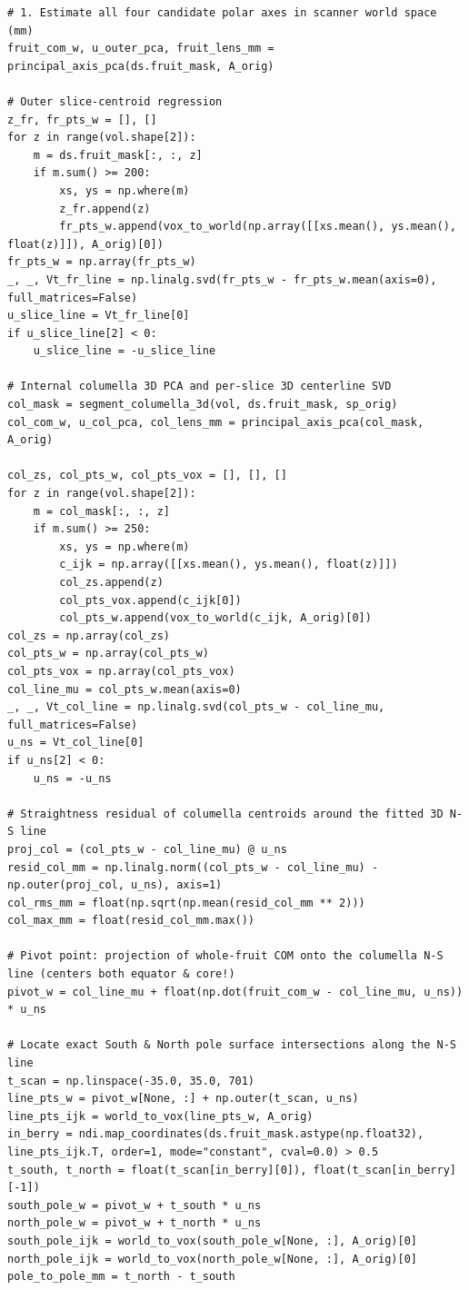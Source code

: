 \documentclass[10pt,a4paper]{article}
\renewcommand{\_}{\origunderscore\allowbreak}
\begin{document}
\begin{codebox}
\begin{lstlisting}[style=pybmed]
# 1. Estimate all four candidate polar axes in scanner world space (mm)
fruit_com_w, u_outer_pca, fruit_lens_mm = principal_axis_pca(ds.fruit_mask, A_orig)

# Outer slice-centroid regression
z_fr, fr_pts_w = [], []
for z in range(vol.shape[2]):
    m = ds.fruit_mask[:, :, z]
    if m.sum() >= 200:
        xs, ys = np.where(m)
        z_fr.append(z)
        fr_pts_w.append(vox_to_world(np.array([[xs.mean(), ys.mean(), float(z)]]), A_orig)[0])
fr_pts_w = np.array(fr_pts_w)
_, _, Vt_fr_line = np.linalg.svd(fr_pts_w - fr_pts_w.mean(axis=0), full_matrices=False)
u_slice_line = Vt_fr_line[0]
if u_slice_line[2] < 0:
    u_slice_line = -u_slice_line

# Internal columella 3D PCA and per-slice 3D centerline SVD
col_mask = segment_columella_3d(vol, ds.fruit_mask, sp_orig)
col_com_w, u_col_pca, col_lens_mm = principal_axis_pca(col_mask, A_orig)

col_zs, col_pts_w, col_pts_vox = [], [], []
for z in range(vol.shape[2]):
    m = col_mask[:, :, z]
    if m.sum() >= 250:
        xs, ys = np.where(m)
        c_ijk = np.array([[xs.mean(), ys.mean(), float(z)]])
        col_zs.append(z)
        col_pts_vox.append(c_ijk[0])
        col_pts_w.append(vox_to_world(c_ijk, A_orig)[0])
col_zs = np.array(col_zs)
col_pts_w = np.array(col_pts_w)
col_pts_vox = np.array(col_pts_vox)
col_line_mu = col_pts_w.mean(axis=0)
_, _, Vt_col_line = np.linalg.svd(col_pts_w - col_line_mu, full_matrices=False)
u_ns = Vt_col_line[0]
if u_ns[2] < 0:
    u_ns = -u_ns

# Straightness residual of columella centroids around the fitted 3D N-S line
proj_col = (col_pts_w - col_line_mu) @ u_ns
resid_col_mm = np.linalg.norm((col_pts_w - col_line_mu) - np.outer(proj_col, u_ns), axis=1)
col_rms_mm = float(np.sqrt(np.mean(resid_col_mm ** 2)))
col_max_mm = float(resid_col_mm.max())

# Pivot point: projection of whole-fruit COM onto the columella N-S line (centers both equator & core!)
pivot_w = col_line_mu + float(np.dot(fruit_com_w - col_line_mu, u_ns)) * u_ns

# Locate exact South & North pole surface intersections along the N-S line
t_scan = np.linspace(-35.0, 35.0, 701)
line_pts_w = pivot_w[None, :] + np.outer(t_scan, u_ns)
line_pts_ijk = world_to_vox(line_pts_w, A_orig)
in_berry = ndi.map_coordinates(ds.fruit_mask.astype(np.float32), line_pts_ijk.T, order=1, mode="constant", cval=0.0) > 0.5
t_south, t_north = float(t_scan[in_berry][0]), float(t_scan[in_berry][-1])
south_pole_w = pivot_w + t_south * u_ns
north_pole_w = pivot_w + t_north * u_ns
south_pole_ijk = world_to_vox(south_pole_w[None, :], A_orig)[0]
north_pole_ijk = world_to_vox(north_pole_w[None, :], A_orig)[0]
pole_to_pole_mm = t_north - t_south


\end{lstlisting}
\end{codebox}
\end{document}
